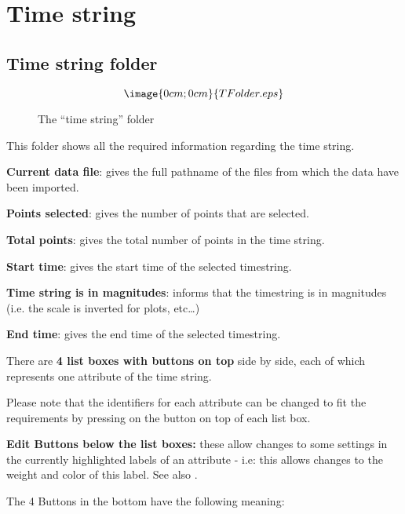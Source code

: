 \section{Time string}%
\label{timestring.detailed}

\subsection{Time string folder}%
\label{timestring.folder}
\begin{figure}[hb]
$$\image{0cm;0cm}{TFolder.eps}$$%
\caption{The ``time string'' folder}%
\label{timestring.folder.dialog}
\end{figure}

This folder shows all the required information regarding the time string.

{\bf Current data file}: 
gives the full pathname 
of the files from which the data have been imported.

{\bf Points selected}: 
gives the number of points that are selected.

{\bf Total points}: 
gives the total number of points in the time string.

{\bf Start time}:
gives the start time of the selected timestring.

{\bf Time string is in magnitudes}:
informs \periodname that the timestring is in magnitudes 
(i.e. the scale is inverted for plots, etc\ldots)

{\bf End time}:
gives the end time of the selected timestring.

There are {\bf 4 list boxes with buttons on top} side by side,
each of which represents one attribute of the time string.

Please note that the identifiers for each attribute can be changed
to fit the requirements by pressing on the button on top of each list box.

{\bf Edit Buttons below the list boxes:}
these allow changes to some settings in the currently 
highlighted labels of an attribute - i.e: this allows changes to
the weight and color of this label.
See also .

The 4 Buttons in the bottom have the following meaning:

